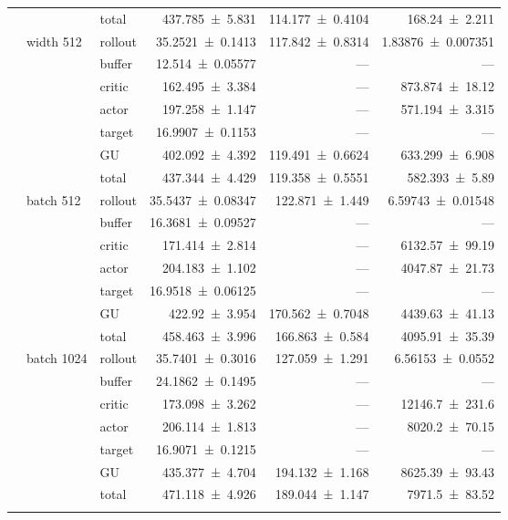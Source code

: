 {\begin{longtable}{@{}lllrrr@{}}
     &  & total & \num{437.785+-5.831} & \num{114.177+-0.4104} & \num{168.24+-2.211} \\
    \addlinespace[2pt]
     & width 512 & rollout & \num{35.2521+-0.1413} & \num{117.842+-0.8314} & \num{1.83876+-0.007351} \\
     &  & buffer & \num{12.514+-0.05577} & --- & --- \\
     &  & critic & \num{162.495+-3.384} & --- & \num{873.874+-18.12} \\
     &  & actor & \num{197.258+-1.147} & --- & \num{571.194+-3.315} \\
     &  & target & \num{16.9907+-0.1153} & --- & --- \\
     &  & GU & \num{402.092+-4.392} & \num{119.491+-0.6624} & \num{633.299+-6.908} \\
     &  & total & \num{437.344+-4.429} & \num{119.358+-0.5551} & \num{582.393+-5.89} \\
    \addlinespace[2pt]
     & batch 512 & rollout & \num{35.5437+-0.08347} & \num{122.871+-1.449} & \num{6.59743+-0.01548} \\
     &  & buffer & \num{16.3681+-0.09527} & --- & --- \\
     &  & critic & \num{171.414+-2.814} & --- & \num{6132.57+-99.19} \\
     &  & actor & \num{204.183+-1.102} & --- & \num{4047.87+-21.73} \\
     &  & target & \num{16.9518+-0.06125} & --- & --- \\
     &  & GU & \num{422.92+-3.954} & \num{170.562+-0.7048} & \num{4439.63+-41.13} \\
     &  & total & \num{458.463+-3.996} & \num{166.863+-0.584} & \num{4095.91+-35.39} \\
    \addlinespace[2pt]
     & batch 1024 & rollout & \num{35.7401+-0.3016} & \num{127.059+-1.291} & \num{6.56153+-0.0552} \\
     &  & buffer & \num{24.1862+-0.1495} & --- & --- \\
     &  & critic & \num{173.098+-3.262} & --- & \num{12146.7+-231.6} \\
     &  & actor & \num{206.114+-1.813} & --- & \num{8020.2+-70.15} \\
     &  & target & \num{16.9071+-0.1215} & --- & --- \\
     &  & GU & \num{435.377+-4.704} & \num{194.132+-1.168} & \num{8625.39+-93.43} \\
     &  & total & \num{471.118+-4.926} & \num{189.044+-1.147} & \num{7971.5+-83.52} \\
    \addlinespace[2pt]
  \end{longtable}
}

